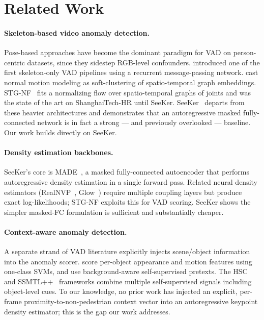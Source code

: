 \documentclass{article}
\begin{document}
\section{Related Work}
\label{sec:related}

\paragraph{Skeleton-based video anomaly detection.}
Pose-based approaches have become the dominant paradigm for VAD on
person-centric datasets, since they sidestep RGB-level confounders.
\citet{morais2019messagepassing} introduced one of the first
skeleton-only VAD pipelines using a recurrent message-passing network.
\citet{markovitz2020graph} cast normal motion modeling as soft-clustering of
spatio-temporal graph embeddings. STG-NF~\citep{hirschorn2023normalizing}
fits a normalizing flow over spatio-temporal graphs of joints and was the
state of the art on ShanghaiTech-HR until SeeKer.
SeeKer~\citep{delic2025seeker} departs from these heavier architectures and
demonstrates that an autoregressive masked fully-connected network is in
fact a strong --- and previously overlooked --- baseline. Our work builds
directly on SeeKer.

\paragraph{Density estimation backbones.}
SeeKer's core is MADE~\citep{germain2015made}, a masked fully-connected
autoencoder that performs autoregressive density estimation in a single
forward pass. Related neural density estimators
(RealNVP~\citep{dinh2017realnvp}, Glow~\citep{kingma2018glow}) require
multiple coupling layers but produce exact log-likelihoods; STG-NF exploits
this for VAD scoring. SeeKer shows the simpler masked-FC formulation is
sufficient and substantially cheaper.

\paragraph{Context-aware anomaly detection.}
A separate strand of VAD literature explicitly injects scene/object
information into the anomaly scorer.
\citet{ionescu2019object} score per-object appearance and motion features
using one-class SVMs, and \citet{georgescu2021background} use background-aware
self-supervised pretexts. The HSC~\citep{sun2023hierarchical} and
SSMTL++~\citep{georgescu2022ssmtl} frameworks combine multiple
self-supervised signals including object-level cues. To our knowledge,
no prior work has injected an explicit, per-frame proximity-to-non-pedestrian
context vector into an autoregressive keypoint density estimator; this is
the gap our work addresses.
\end{document}
